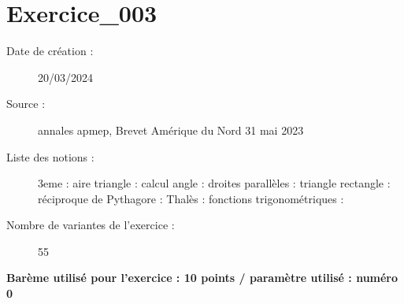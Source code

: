 \bigskip



\section{Exercice\_003}

\begin{description}
\item[Date de création : ]20/03/2024
\item[Source : ]annales apmep, Brevet Amérique du Nord 31 mai 2023
\item[Liste des notions : ]3eme : aire triangle : calcul angle : droites parallèles : triangle rectangle : réciproque de Pythagore : Thalès : fonctions trigonométriques : 
\item[Nombre de variantes de l'exercice : ]55
\end{description}

\centerline{\bf\large Barème utilisé pour l'exercice : 10 points / paramètre utilisé : numéro 0}



\EXERCICE 
{} 

